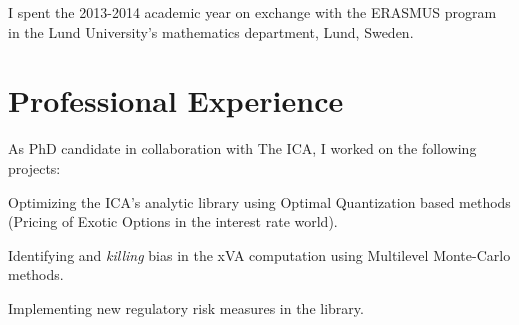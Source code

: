 \documentclass[]{deedy-resume-openfont}
\begin{document}
\begin{minipage}[t]{0.64\textwidth}
I spent the 2013-2014 academic year on exchange with the ERASMUS program in the Lund University's mathematics department, Lund, Sweden.








\vspace{\topsep}
\vspace{\topsep}
\section{Professional Experience}

As PhD candidate in collaboration with The ICA, I worked on the following projects:
\begin{tightemize}
\item Optimizing the ICA's analytic library using Optimal Quantization based methods (Pricing of Exotic Options in the interest rate world).
\item Identifying and \textit{killing} bias in the xVA computation using Multilevel Monte-Carlo methods.
\item Implementing new regulatory risk measures in the library.
\end{tightemize}


\end{minipage}
\end{document}

